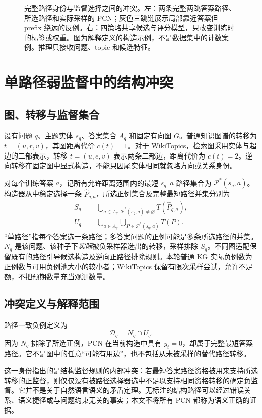 \documentclass[UTF8,a4paper,10pt,fontset=fandol]{ctexart}
\newcommand{\pcn}{\mathcal D_q}
\begin{document}
\begin{figure}[tbp]
\begin{lrbox}{\pcnfigurebox}
\end{lrbox}\resizebox{\linewidth}{!}{\usebox{\pcnfigurebox}}
\caption{完整路径身份与监督选择之间的冲突。左：两条完整两跳答案路径、所选路径和实际采样的 PCN；灰色三跳链展示局部靠近答案但 prefix 绕远的反例。右：四策略共享候选与评分模型，只改变训练时的标签或权重。图为解释定义的构造示例，不是数据集中的计数案例。推理只接收问题、topic 和候选特征。}\label{fig:overview}
\end{figure}

\section{单路径弱监督中的结构冲突}
\subsection{图、转移与监督集合}
设有问题 $q$、主题实体 $s_q$、答案集合 $A_q$ 和固定有向图 $G$。普通知识图谱的转移为 $t=(u,r,v)$，其图距离代价 $c(t)=1$。对于 WikiTopics，检索图采用实体与超边的二部表示，转移 $t=(u,e,v)$ 表示两条二部边，距离代价为 $c(t)=2$。逆向转移在固定图中显式构造，不能只因尾实体相同就忽略方向或关系身份。

对每个训练答案 $a$，记所有允许距离范围内的最短 $s_q$--$a$ 路径集合为 $\mathcal P^*(s_q,a)$。构造器从中稳定选择一条 $\widehat P_{q,a}$，所选正例集合及完整最短路径并集分别为
\begin{align}
S_q &= \bigcup_{a\in A_q:\,\mathcal P^*(s_q,a)\ne\varnothing} T(\widehat P_{q,a}),\\
U_q &= \bigcup_{a\in A_q} \bigcup_{P\in\mathcal P^*(s_q,a)}T(P).
\end{align}
“单路径”指每个答案选一条路径；多答案问题的正例可能是多条所选路径的并集。$N_q$ 是该问题、该种子下\emph{实际}被负采样器选出的转移，采样排除 $S_q$。不同图适配保留既有的路径引导候选构造及逆向正路径排除规则。本轮普通 KG 实际负例数为正例数与可用负例池大小的较小者；WikiTopics 保留有限次采样尝试，允许不足额，不把预期数量充当观测数量。

\subsection{冲突定义与解释范围}
路径一致负例定义为
\begin{equation}
\pcn=N_q\cap U_q.
\label{eq:pcn}
\end{equation}
因为 $N_q$ 排除了所选正例，PCN 在当前构造中具有 $y_t=0$，却属于完整最短答案路径。它不是图中的任意“可能有用边”，也不包括从未被采样的替代路径转移。

这一身份指出的是结构监督规则的内部冲突：若最短答案路径资格被用来支持所选转移的正监督，则仅仅没有被路径选择器选中不足以支持相同资格转移的确定负监督。它并不是关于自然语言语义的矛盾定理。无标注的结构路径可以经过错误关系、语义捷径或与问题约束无关的事实；本文不将所有 PCN 都称为语义正确的证据。
\end{document}
